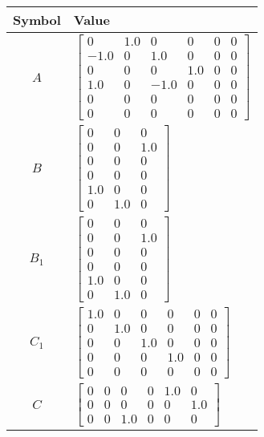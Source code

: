 \begin{tabular}{cl}
\hline
  Symbol  & Value                                                                                                                                                                                           \\
\hline
   $A$    & $\left[\begin{matrix}0 & 1.0 & 0 & 0 & 0 & 0\\-1.0 & 0 & 1.0 & 0 & 0 & 0\\0 & 0 & 0 & 1.0 & 0 & 0\\1.0 & 0 & -1.0 & 0 & 0 & 0\\0 & 0 & 0 & 0 & 0 & 0\\0 & 0 & 0 & 0 & 0 & 0\end{matrix}\right]$ \\
   $B$    & $\left[\begin{matrix}0 & 0 & 0\\0 & 0 & 1.0\\0 & 0 & 0\\0 & 0 & 0\\1.0 & 0 & 0\\0 & 1.0 & 0\end{matrix}\right]$                                                                                 \\
 $B_{1}$  & $\left[\begin{matrix}0 & 0 & 0\\0 & 0 & 1.0\\0 & 0 & 0\\0 & 0 & 0\\1.0 & 0 & 0\\0 & 1.0 & 0\end{matrix}\right]$                                                                                 \\
 $C_{1}$  & $\left[\begin{matrix}1.0 & 0 & 0 & 0 & 0 & 0\\0 & 1.0 & 0 & 0 & 0 & 0\\0 & 0 & 1.0 & 0 & 0 & 0\\0 & 0 & 0 & 1.0 & 0 & 0\\0 & 0 & 0 & 0 & 0 & 0\end{matrix}\right]$                              \\
   $C$    & $\left[\begin{matrix}0 & 0 & 0 & 0 & 1.0 & 0\\0 & 0 & 0 & 0 & 0 & 1.0\\0 & 0 & 1.0 & 0 & 0 & 0\end{matrix}\right]$                                                                              \\

\end{tabular}
